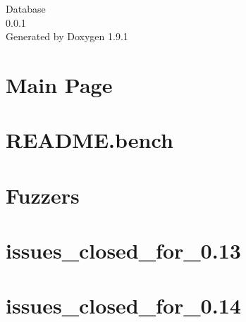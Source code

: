 \let\mypdfximage\pdfximage\def\pdfximage{\immediate\mypdfximage}\documentclass[twoside]{book}
\newcommand{\+}{\discretionary{\mbox{\scriptsize$\hookleftarrow$}}{}{}}
\newcommand{\clearemptydoublepage}{%
  \newpage{\pagestyle{empty}\cleardoublepage}%
}
\begin{document}
\raggedbottom

\hypersetup{pageanchor=false,
             bookmarksnumbered=true,
             pdfencoding=unicode
            }
\begin{titlepage}
\vspace*{7cm}
\begin{center}%
{\Large Database \\[1ex]\large 0.\+0.\+1 }\\
\vspace*{1cm}
{\large Generated by Doxygen 1.9.1}\\
\end{center}
\end{titlepage}
\clearemptydoublepage
{}
\tableofcontents
\clearemptydoublepage
{}
\hypersetup{pageanchor=true}

\chapter{Main Page}
\label{index}\hypertarget{index}{}
\chapter{README.\+bench}
\label{md_src_libs_external_json_c_bench__r_e_a_d_m_e_bench}

\chapter{Fuzzers}
\label{md_src_libs_external_json_c_fuzz__r_e_a_d_m_e}

\chapter{issues\+\_\+closed\+\_\+for\+\_\+0.13}
\label{md_src_libs_external_json_c_issues_closed_for_0_13}

\chapter{issues\+\_\+closed\+\_\+for\+\_\+0.14}
\label{md_src_libs_external_json_c_issues_closed_for_0_14}

\end{document}
